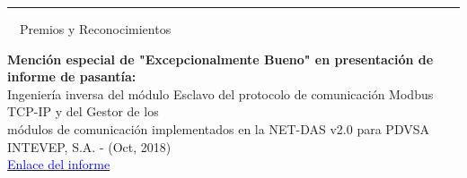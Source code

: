 \documentclass[a4paper,20pt]{article}
\makeatletter
\newcommand{\resumeItem}[2]{
  \item\small{
    \textbf{#1}{: #2 \vspace{-2pt}}
  }
}
\newcommand{\resumeSubheading}[4]{
  \vspace{-1pt}\item
    \begin{tabular*}{0.97\textwidth}{l@{\extracolsep{\fill}}r}
      \textbf{#1} & #2 \\
      \textit{#3} & \textit{#4} \\
    \end{tabular*}\vspace{-5pt}
}
\newcommand{\resumeSubItem}[2]{\resumeItem{#1}{#2}\vspace{-3pt}}
\newcommand{\resumeSubHeadingListStart}{\begin{itemize}[leftmargin=*]}
\newcommand{\resumeSubHeadingListEnd}{\end{itemize}}
\makeatother
\begin{document}



\vspace{10pt}
 \textcolor{NavyBlue}{ \rule[1mm]{2cm}{2mm} {\LARGE ~~Premios y Reconocimientos}}
\vspace{2pt}
\begin{description}[font=$\bullet$]
\item {\textbf{Mención especial de "Excepcionalmente Bueno" en presentación de informe de pasantía:}}\\
 {Ingeniería inversa del módulo Esclavo del protocolo de comunicación Modbus TCP-IP y del Gestor de los \\módulos de comunicación implementados en la NET-DAS v2.0 para PDVSA INTEVEP, S.A. - (Oct, 2018)}\\
 \vspace{4pt}
 {{\href{https://drive.google.com/file/d/1bHQlD1dOGpO19o5fX3Z03ocKmDDeeF34/view}{\textcolor{Blue}{Enlace del informe}}}}
 

\end{description}


\end{document}

